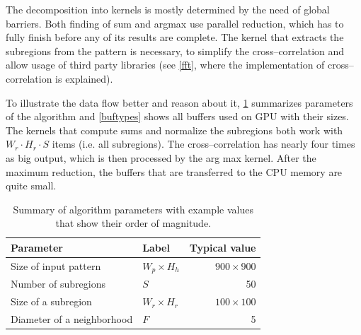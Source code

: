 The decomposition into kernels is mostly determined by the need of global barriers. Both finding of sum and argmax use parallel reduction, which has to fully finish before any of its results are complete. The kernel that extracts the subregions from the pattern is necessary, to simplify the cross--correlation and allow usage of third party libraries (see \cref{fft}, where the implementation of cross--correlation is explained).

To illustrate the data flow better and reason about it, \cref{params} summarizes parameters of the algorithm and \cref{buftypes} shows all buffers used on GPU with their sizes. The kernels that compute sums and normalize the subregions both work with $W_r \cdot H_r \cdot S$ items (i.e. all subregions). The cross--correlation has nearly four times as big output, which is then processed by the arg max kernel. After the maximum reduction, the buffers that are transferred to the CPU memory are quite small.

\begin{table}[]
	\centering
	\begin{tabular}{@{}llr@{}}
		\toprule
		Parameter                  & Label            &    Typical value \\ \midrule
		Size of input pattern      & $W_p \times H_h$ & $900 \times 900$ \\
		Number of subregions       & $S$              &               50 \\
		Size of a subregion        & $W_r \times H_r$ & $100 \times 100$ \\
		Diameter of a neighborhood & $F$              &                5 \\ \bottomrule
	\end{tabular}
	\caption{Summary of algorithm parameters with example values that show their order of magnitude.}
	\label{params}
\end{table}

